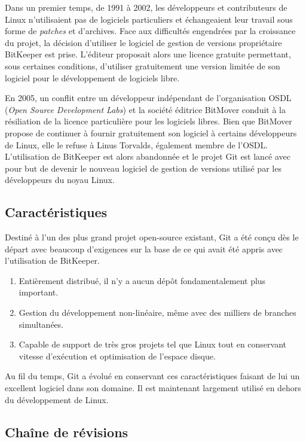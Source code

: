 \documentclass[11pt,a4paper]{article}
\begin{document}
Dans un premier temps, de 1991 à 2002, les développeurs et contributeurs de Linux n'utilisaient pas de logiciels particuliers et échangeaient leur travail sous forme de \textit{patches} et d'archives.
Face aux difficultés engendrées par la croissance du projet, la décision d'utiliser le logiciel de gestion de versions propriétaire BitKeeper est prise.
L'éditeur proposait alors une licence gratuite permettant, sous certaines conditions, d'utiliser gratuitement une version limitée de son logiciel pour le développement de logiciels libre.

En 2005, un conflit entre un développeur indépendant de l'organisation OSDL (\textit{Open Source Development Labs}) et la société éditrice BitMover conduit à la résiliation de la licence particulière pour les logiciels libres.
Bien que BitMover propose de continuer à fournir gratuitement son logiciel à certains développeurs de Linux, elle le refuse à Linus Torvalds, également membre de l'OSDL.
L'utilisation de BitKeeper est alors abandonnée et le projet Git est lancé avec pour but de devenir le nouveau logiciel de gestion de versions utilisé par les développeurs du noyau Linux.

\subsection{Caractéristiques}

Destiné à l'un des plus grand projet open-source existant, Git a été conçu dès le départ avec beaucoup d'exigences sur la base de ce qui avait été appris avec l'utilisation de BitKeeper.

\begin{enumerate}
	\item {Entièrement distribué}, 
	il n'y a aucun dépôt fondamentalement plus important.
	
	\item {Gestion du développement non-linéaire},
	même avec des milliers de branches simultanées.
	
	\item {Capable de support de très gros projets}
	tel que Linux tout en conservant vitesse d'exécution et optimisation de l'espace disque.
\end{enumerate}

Au fil du temps, Git a évolué en conservant ces caractéristiques faisant de lui un excellent logiciel dans son domaine.
Il est maintenant largement utilisé en dehors du développement de Linux.

\subsection{Chaîne de révisions}
\end{document}
